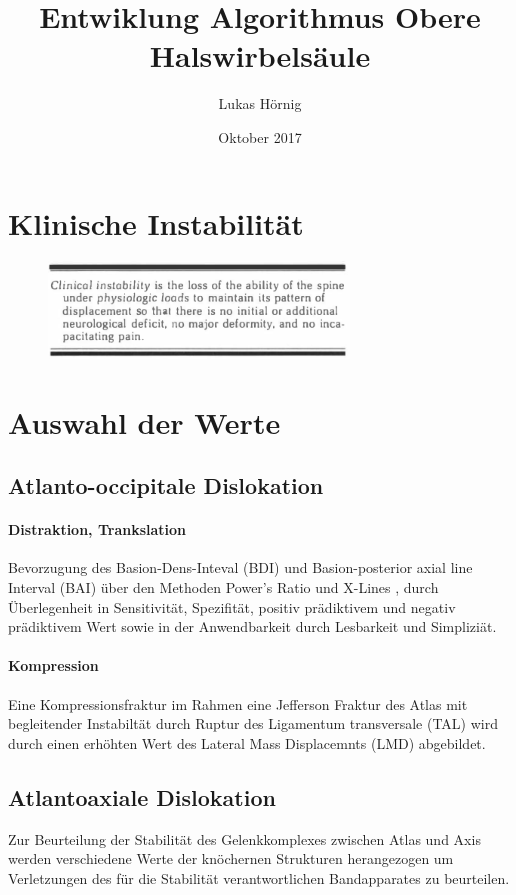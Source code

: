\documentclass{report}
\title{Entwiklung Algorithmus Obere Halswirbelsäule}
\author{Lukas Hörnig}
\date{Oktober 2017}
\begin{document}
\section{Klinische Instabilität}
\begin{figure}[h]
        \includegraphics[width=8cm]{Instability.png}
\end{figure}

\section{Auswahl der Werte}
\subsection{Atlanto-occipitale Dislokation}
\paragraph{Distraktion, Trankslation}
Bevorzugung des Basion-Dens-Inteval (BDI) und Basion-posterior axial line Interval (BAI) \cite{WHOLEY1958,Harris1994,Harris1994a} über den Methoden Power's Ratio \cite{Powers1979} und X-Lines \cite{Lee1987}, durch Überlegenheit in Sensitivität, Spezifität, positiv prädiktivem und negativ prädiktivem Wert sowie in der Anwendbarkeit durch Lesbarkeit und Simpliziät. \cite{Deliganis2000,Fisher2001,Harris1994,Dziurzynski2005,Radcliff2010,Chang2009,Chaput2011,Bono2007}\\

\paragraph{Kompression}
Eine Kompressionsfraktur im Rahmen eine Jefferson Fraktur des Atlas \cite{Jefferson1919,Jefferson1927} mit begleitender Instabiltät durch Ruptur des Ligamentum transversale (TAL) wird durch einen erhöhten Wert des Lateral Mass Displacemnts (LMD) abgebildet.
\subsection{Atlantoaxiale Dislokation}

Zur Beurteilung der Stabilität des Gelenkkomplexes zwischen Atlas und Axis werden verschiedene Werte der knöchernen Strukturen herangezogen um Verletzungen des für die Stabilität verantwortlichen Bandapparates zu beurteilen. \cite{Dvorak1988,Lopez2015,White1990}
\end{document}
